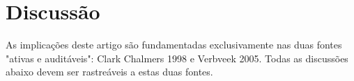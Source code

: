 \documentclass[12pt,a4paper]{article}
\begin{document}


\section{Discussão}

As implicações deste artigo são fundamentadas exclusivamente nas duas fontes "ativas e auditáveis": Clark Chalmers 1998 e Verbveek 2005. Todas as discussões abaixo devem ser rastreáveis a estas duas fontes.





\end{document}
